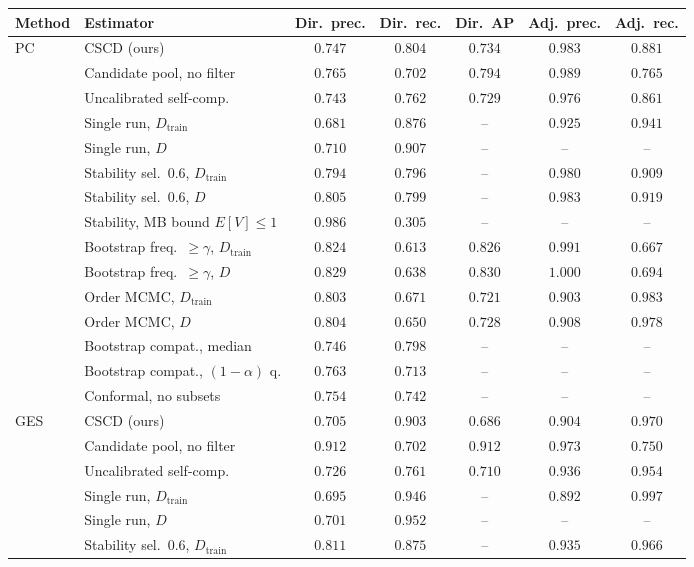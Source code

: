 \begin{tabular}{llccccc}
\toprule
Method & Estimator & Dir.\ prec. & Dir.\ rec. & Dir.\ AP & Adj.\ prec. & Adj.\ rec. \\
\midrule
PC & CSCD (ours) & $0.747$ & $0.804$ & $0.734$ & $0.983$ & $0.881$ \\
 & Candidate pool, no filter & $0.765$ & $0.702$ & $0.794$ & $0.989$ & $0.765$ \\
 & Uncalibrated self-comp. & $0.743$ & $0.762$ & $0.729$ & $0.976$ & $0.861$ \\
 & Single run, $D_{\mathrm{train}}$ & $0.681$ & $0.876$ & -- & $0.925$ & $0.941$ \\
 & Single run, $D$ & $0.710$ & $0.907$ & -- & -- & -- \\
 & Stability sel.\ 0.6, $D_{\mathrm{train}}$ & $0.794$ & $0.796$ & -- & $0.980$ & $0.909$ \\
 & Stability sel.\ 0.6, $D$ & $0.805$ & $0.799$ & -- & $0.983$ & $0.919$ \\
 & Stability, MB bound $E[V]\le1$ & $0.986$ & $0.305$ & -- & -- & -- \\
 & Bootstrap freq.\ $\ge\gamma$, $D_{\mathrm{train}}$ & $0.824$ & $0.613$ & $0.826$ & $0.991$ & $0.667$ \\
 & Bootstrap freq.\ $\ge\gamma$, $D$ & $0.829$ & $0.638$ & $0.830$ & $1.000$ & $0.694$ \\
 & Order MCMC, $D_{\mathrm{train}}$ & $0.803$ & $0.671$ & $0.721$ & $0.903$ & $0.983$ \\
 & Order MCMC, $D$ & $0.804$ & $0.650$ & $0.728$ & $0.908$ & $0.978$ \\
 & Bootstrap compat., median & $0.746$ & $0.798$ & -- & -- & -- \\
 & Bootstrap compat., $(1-\alpha)$ q. & $0.763$ & $0.713$ & -- & -- & -- \\
 & Conformal, no subsets & $0.754$ & $0.742$ & -- & -- & -- \\
\addlinespace
GES & CSCD (ours) & $0.705$ & $0.903$ & $0.686$ & $0.904$ & $0.970$ \\
 & Candidate pool, no filter & $0.912$ & $0.702$ & $0.912$ & $0.973$ & $0.750$ \\
 & Uncalibrated self-comp. & $0.726$ & $0.761$ & $0.710$ & $0.936$ & $0.954$ \\
 & Single run, $D_{\mathrm{train}}$ & $0.695$ & $0.946$ & -- & $0.892$ & $0.997$ \\
 & Single run, $D$ & $0.701$ & $0.952$ & -- & -- & -- \\
 & Stability sel.\ 0.6, $D_{\mathrm{train}}$ & $0.811$ & $0.875$ & -- & $0.935$ & $0.966$ \\

\end{tabular}
